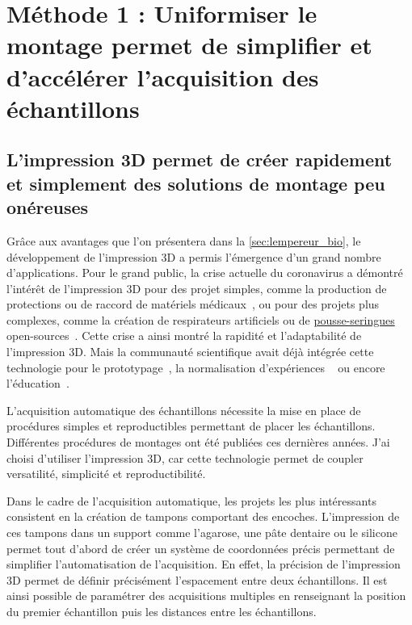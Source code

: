 \documentclass[\main/main.tex]{subfiles}
\begin{document}
\chapter{
    \label{sec:montage}
    Méthode 1 : Uniformiser le montage permet de simplifier et d'accélérer l'acquisition des échantillons
    }

    \section{L'impression 3D permet de créer rapidement et simplement des solutions de montage peu onéreuses}
    
%
Grâce aux avantages que l'on présentera dans la \autoref{sec:lempereur_bio}, le développement de l'impression 3D a permis l'émergence d'un grand nombre d'applications.
%
Pour le grand public, la crise actuelle du coronavirus a démontré l'intérêt de l'impression 3D
pour des projet simples, comme la production de protections ou de raccord de matériels médicaux~\cite{callahan_2020,ishack_2020,wesemann_2020}, ou pour des projets plus complexes, comme la création de respirateurs artificiels ou de \href{https://covid3d.org/projects/pousse-seringue}{pousse-seringues} open-sources~\cite{na_website_nda}.
%
Cette crise a ainsi montré la rapidité et l'adaptabilité de l'impression 3D.
%
Mais la communauté scientifique avait déjà intégrée cette technologie pour le prototypage~\cite{he_2016}, la normalisation d'expériences ~\cite{pinskiy_2013} ou encore l'éducation~\cite{maiachagas_2017}.
    
%
L'acquisition automatique des échantillons nécessite la mise en place de procédures simples
et reproductibles permettant de placer les échantillons.
%
Différentes procédures de montages ont été publiées ces dernières années.
%
J'ai choisi d'utiliser l'impression 3D, car cette technologie permet de coupler versatilité, simplicité et reproductibilité.

%
Dans le cadre de l'acquisition automatique, les projets les plus intéressants consistent en la création de tampons comportant des encoches.
%
L'impression de ces tampons dans un support comme l'agarose, une pâte dentaire ou le silicone permet tout d'abord de créer un système de coordonnées précis
permettant de simplifier l'automatisation de l'acquisition. En effet, la précision de l'impression 3D permet de définir précisément l'espacement entre deux échantillons.
Il est ainsi possible de paramétrer des acquisitions multiples en renseignant la position du premier échantillon puis les distances entre les échantillons.
\end{document}
